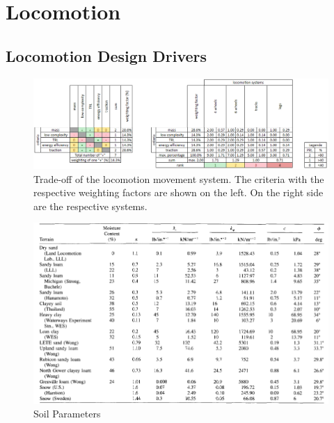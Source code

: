 \section{Locomotion} 
\label{app:Loco}

\subsection{Locomotion Design Drivers}
\label{app:DesignDrivers}

\begin{figure}[htb] 
  \centering
     \includegraphics[width=1\textwidth]{Media/LocomotionTradeOff.png}
  \caption{Trade-off of the locomotion movement system. The criteria with the respective weighting factors are shown on the left. On the right side are the respective systems.}
  \label{fig:TradeOffLoco}
\end{figure}


\begin{figure}[htb] 
  \centering
     \includegraphics[width=1\textwidth]{Media/SoilParameters.png}
  \caption{Soil Parameters}
  \label{fig:SoilParameters}
\end{figure}


